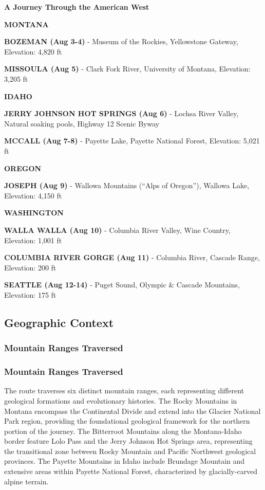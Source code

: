 \documentclass[
  11pt,
  letterpaper,
  DIV=10,
  numbers=noendperiod]{scrartcl}
\begin{document}
\textbf{A Journey Through the American West}

\textbf{MONTANA}

\textbf{BOZEMAN (Aug 3-4)} - Museum of the Rockies, Yellowstone Gateway,
Elevation: 4,820 ft

\textbf{MISSOULA (Aug 5)} - Clark Fork River, University of Montana,
Elevation: 3,205 ft

\textbf{IDAHO}

\textbf{JERRY JOHNSON HOT SPRINGS (Aug 6)} - Lochsa River Valley,
Natural soaking pools, Highway 12 Scenic Byway

\textbf{MCCALL (Aug 7-8)} - Payette Lake, Payette National Forest,
Elevation: 5,021 ft

\textbf{OREGON}

\textbf{JOSEPH (Aug 9)} - Wallowa Mountains (``Alps of Oregon''),
Wallowa Lake, Elevation: 4,150 ft

\textbf{WASHINGTON}

\textbf{WALLA WALLA (Aug 10)} - Columbia River Valley, Wine Country,
Elevation: 1,001 ft

\textbf{COLUMBIA RIVER GORGE (Aug 11)} - Columbia River, Cascade Range,
Elevation: 200 ft

\textbf{SEATTLE (Aug 12-14)} - Puget Sound, Olympic \& Cascade
Mountains, Elevation: 175 ft

\subsection{Geographic Context}\label{geographic-context}

\subsubsection{Mountain Ranges
Traversed}\label{mountain-ranges-traversed}

\subsubsection{Mountain Ranges
Traversed}\label{mountain-ranges-traversed-1}

The route traverses six distinct mountain ranges, each representing
different geological formations and evolutionary histories. The Rocky
Mountains in Montana encompass the Continental Divide and extend into
the Glacier National Park region, providing the foundational geological
framework for the northern portion of the journey. The Bitterroot
Mountains along the Montana-Idaho border feature Lolo Pass and the Jerry
Johnson Hot Springs area, representing the transitional zone between
Rocky Mountain and Pacific Northwest geological provinces. The Payette
Mountains in Idaho include Brundage Mountain and extensive areas within
Payette National Forest, characterized by glacially-carved alpine
terrain.
\end{document}
